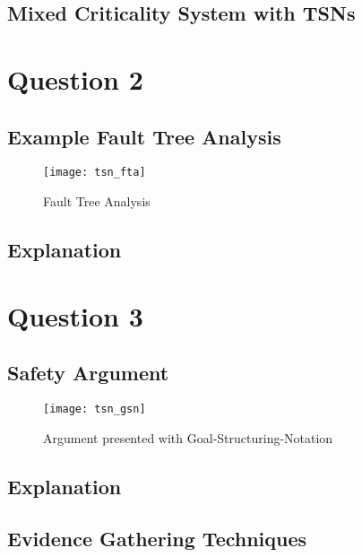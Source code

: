 \subsection{Mixed Criticality System with TSNs}

\section{Question 2}

\subsection{Example Fault Tree Analysis}

\begin{figure}[h]
\centering
\texttt{[image: tsn\_fta]}
\caption{Fault Tree Analysis}
\end{figure}

\subsection{Explanation}

\subsection{}

\section{Question 3}

\subsection{Safety Argument}

\begin{figure}[h]
\centering
\texttt{[image: tsn\_gsn]}
\caption{Argument presented with Goal-Structuring-Notation}
\end{figure}

\subsection{Explanation}

\subsection{Evidence Gathering Techniques}
